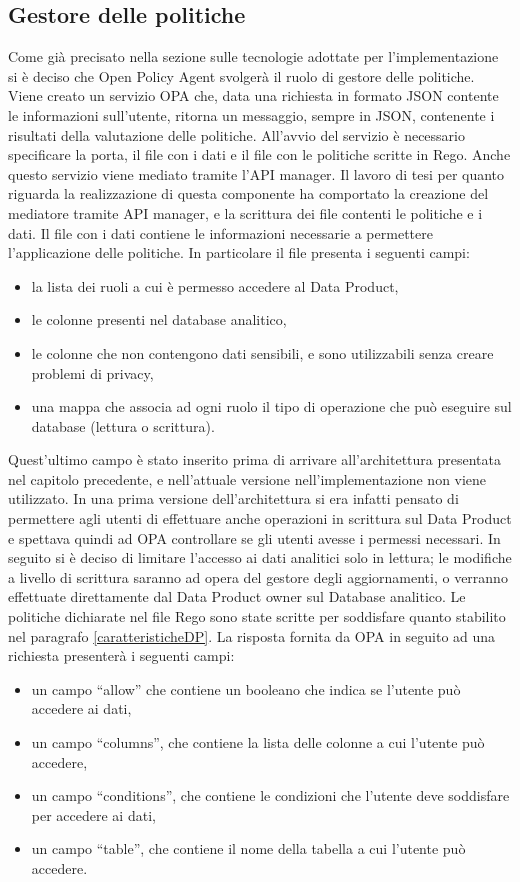 \documentclass[12pt]{report}
\begin{document}
\subsection{Gestore delle politiche}
Come già precisato nella sezione sulle tecnologie adottate per l'implementazione si è deciso che Open Policy Agent svolgerà il ruolo di gestore delle politiche.
Viene creato un servizio OPA che, data una richiesta in formato JSON contente le informazioni sull'utente, ritorna un messaggio, sempre in JSON, contenente i risultati della valutazione delle politiche.
All'avvio del servizio è necessario specificare la porta, il file con i dati e il file con le politiche scritte in Rego.
Anche questo servizio viene mediato tramite l'API manager.
Il lavoro di tesi per quanto riguarda la realizzazione di  questa componente ha comportato la creazione del mediatore tramite API manager, e la scrittura dei file contenti le politiche e i dati.
Il file con i dati contiene le informazioni necessarie a permettere l'applicazione delle politiche.
In particolare il file presenta i seguenti campi:
\begin{itemize}
    \item la lista dei ruoli a cui è permesso accedere al Data Product,
    \item le colonne presenti nel database analitico,
    \item le colonne che non contengono dati sensibili, e sono utilizzabili senza creare problemi di privacy,
    \item una mappa che associa ad ogni ruolo il tipo di operazione che può eseguire sul database (lettura o scrittura).
\end{itemize}
Quest'ultimo campo è stato inserito prima di arrivare all'architettura presentata nel capitolo precedente, e nell'attuale versione nell'implementazione non viene utilizzato.
In una prima versione dell'architettura si era infatti pensato di permettere agli utenti di effettuare anche operazioni in scrittura sul Data Product e spettava quindi ad OPA controllare se gli utenti avesse i permessi necessari.
In seguito si è deciso di limitare l'accesso ai dati analitici solo in lettura; le modifiche a livello di scrittura saranno ad opera del gestore degli aggiornamenti, o verranno effettuate direttamente dal Data Product owner sul Database analitico.
Le politiche dichiarate nel file Rego sono state scritte per soddisfare quanto stabilito nel paragrafo \ref{caratteristicheDP}.
La risposta fornita da OPA in seguito ad una richiesta presenterà i seguenti campi:
\begin{itemize}
    \item un campo ``allow'' che contiene un booleano che indica se l'utente può accedere ai dati,
    \item un campo ``columns'', che contiene la lista delle colonne a cui l'utente può accedere,
    \item un campo ``conditions'', che contiene le condizioni che l'utente deve soddisfare per accedere ai dati,
    \item un campo ``table'', che contiene il nome della tabella a cui l'utente può accedere.
\end{itemize}
\end{document}
